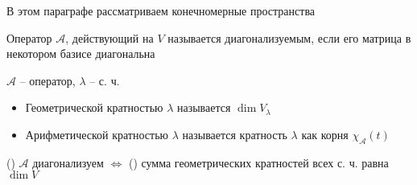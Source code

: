 В этом параграфе рассматриваем конечномерные пространства

\begin{definition}
	Оператор $ \mathcal{A} $, действующий на $ V $ называется диагонализуемым, если его матрица в некотором базисе диагональна
\end{definition}

\begin{definition}
	$ \mathcal{A} $ -- оператор, $ \lambda $ -- с. ч.
	\begin{itemize}
		\item Геометрической кратностью $ \lambda $ называется $ \dim V_\lambda $
		\item Арифметической кратностью $ \lambda $ называется кратность $ \lambda $ как корня $ \chi_{\mathcal{A}}(t) $
	\end{itemize}
\end{definition}

\begin{theorem}
	() $ \mathcal{A} $ диагонализуем $ \iff $ () сумма геометрических кратностей всех с. ч. равна $ \dim V $
\end{theorem}

